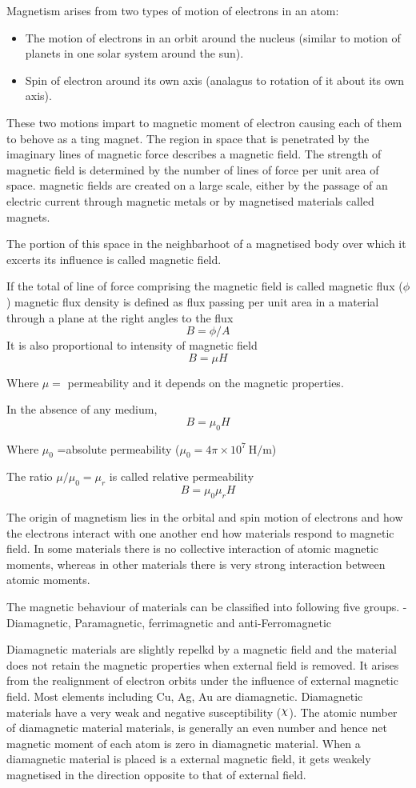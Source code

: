 \documentclass[12pt, a4paper]{article}
\begin{document}

Magnetism arises from two types of motion of electrons in an atom:
\begin{itemize}
	\item The motion of electrons in an orbit around the nucleus (similar to motion of planets in one solar system around the sun).
	\item Spin of electron around its own axis (analagus to rotation of it about its own axis).
\end{itemize}
\doparindent
These two motions impart to magnetic moment of electron causing each of them to behove as a ting magnet. The region in space that is penetrated by the imaginary lines of magnetic force describes a magnetic field. The strength of magnetic field is determined by the number of lines of force per unit area of space. magnetic fields are created on a large scale, either by the passage of an electric current through magnetic metals or by magnetised materials called magnets.

The portion of this space in the neighbarhoot of a magnetised body over which it excerts its influence is called magnetic field.

If the total of line of force comprising the magnetic field is called magnetic flux ($\phi$) magnetic flux density is defined as flux passing per unit area in a material through a plane at the right angles to the flux
$$B=\phi/A$$
\noparindent
It is also proportional to intensity of magnetic field
$$
	B=\mu H$$

Where $\mu=$ permeability and it depends on the magnetic properties.

In the absence of any medium,
$$B=\mu_0 H$$

Where $\mu_0$ =absolute permeability ($\mu_0 = 4\pi\times10^7\ \mathrm{H/m}$)

The ratio $\mu/\mu_0=\mu_r$ is called relative permeability
$$
	B=\mu_0 \mu_r H
$$

The origin of magnetism lies in the orbital and spin motion of electrons and how the electrons interact with one another end how materials respond to magnetic field. In some materials there is no collective interaction of atomic magnetic moments, whereas in other materials there is very strong interaction between atomic moments.

The magnetic behaviour of materials can be classified into following five groups.
- Diamagnetic, Paramagnetic, ferrimagnetic and anti-Ferromagnetic

Diamagnetic materials are slightly repelkd by a magnetic field and the material does not retain the magnetic properties when external field is removed. It arises from the realignment of electron orbits under the influence of external magnetic field. Most elements including Cu, Ag, Au are diamagnetic. Diamagnetic materials have a very weak and negative susceptibility ($\rchi$).
The atomic number of diamagnetic material materials, is generally an even number and hence net magnetic moment of each atom is zero in diamagnetic material. When a diamagnetic material is placed is a external magnetic field, it gets weakely magnetised in the direction opposite to that of external field.
\end{document}
